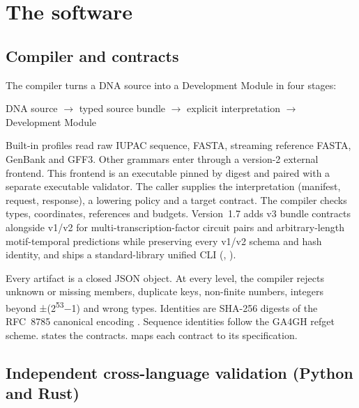 \documentclass[10.5pt,a4paper]{article}
\begin{document}
\section{The software}\label{sec:software}

\subsection{Compiler and contracts}

The compiler turns a DNA source into a Development Module in four stages:
\begin{center}DNA source $\rightarrow$ typed source bundle $\rightarrow$ explicit interpretation $\rightarrow$ Development Module\end{center}
Built-in profiles read raw IUPAC sequence, FASTA, streaming reference FASTA, GenBank and GFF3. Other grammars enter through a version-2 external frontend. This frontend is an executable pinned by digest and paired with a separate executable validator. The caller supplies the interpretation (manifest, request, response), a lowering policy and a target contract. The compiler checks types, coordinates, references and budgets. Version~1.7 adds  v3 bundle contracts alongside v1/v2 for multi-transcription-factor circuit pairs and arbitrary-length motif-temporal predictions while preserving every v1/v2 schema and hash identity, and ships a standard-library unified CLI (, ).

Every artifact is a closed JSON object. At every level, the compiler rejects unknown or missing members, duplicate keys, non-finite numbers, integers beyond ±(2\textsuperscript{53}−1) and wrong types. Identities are SHA-256 digests of the RFC~8785 canonical encoding \citep{rundgren2020,nist2015}. Sequence identities follow the GA4GH refget scheme.  states the contracts.  maps each contract to its specification.

\subsection{Independent cross-language validation (Python and Rust)}
\end{document}
